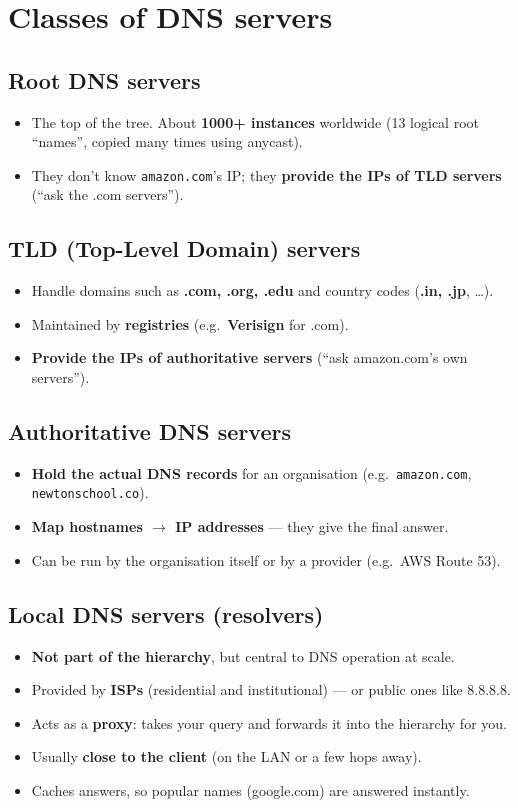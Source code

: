 \section{Classes of DNS servers}
\subsection{Root DNS servers}
\begin{itemize}
  \item The top of the tree. About \textbf{1000+ instances} worldwide (13 logical root ``names'', copied many times using anycast).
  \item They don't know \texttt{amazon.com}'s IP; they \textbf{provide the IPs of TLD servers} (``ask the .com servers'').
\end{itemize}
\subsection{TLD (Top-Level Domain) servers}
\begin{itemize}
  \item Handle domains such as \textbf{.com, .org, .edu} and country codes (\textbf{.in, .jp}, \ldots).
  \item Maintained by \textbf{registries} (e.g.\ \textbf{Verisign} for .com).
  \item \textbf{Provide the IPs of authoritative servers} (``ask amazon.com's own servers'').
\end{itemize}
\subsection{Authoritative DNS servers}
\begin{itemize}
  \item \textbf{Hold the actual DNS records} for an organisation (e.g.\ \texttt{amazon.com}, \texttt{newtonschool.co}).
  \item \textbf{Map hostnames $\to$ IP addresses} --- they give the final answer.
  \item Can be run by the organisation itself or by a provider (e.g.\ AWS Route 53).
\end{itemize}

\subsection{Local DNS servers (resolvers)}
\begin{itemize}
  \item \textbf{Not part of the hierarchy}, but central to DNS operation at scale.
  \item Provided by \textbf{ISPs} (residential and institutional) --- or public ones like 8.8.8.8.
  \item Acts as a \textbf{proxy}: takes your query and forwards it into the hierarchy for you.
  \item Usually \textbf{close to the client} (on the LAN or a few hops away).
  \item Caches answers, so popular names (google.com) are answered instantly.
\end{itemize}

